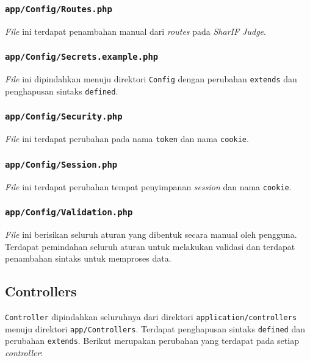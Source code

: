 \subsubsection{\texttt{app/Config/Routes.php}}
\textit{File} ini terdapat penambahan manual dari \textit{routes} pada \textit{SharIF Judge}.
\subsubsection{\texttt{app/Config/Secrets.example.php}}
\textit{File} ini dipindahkan menuju direktori \texttt{Config} dengan perubahan \texttt{extends} dan penghapusan sintaks \texttt{defined}.
\subsubsection{\texttt{app/Config/Security.php}}
\textit{File} ini terdapat perubahan pada nama \texttt{token} dan nama \texttt{cookie}.
\subsubsection{\texttt{app/Config/Session.php}}
\textit{File} ini terdapat perubahan tempat penyimpanan \textit{session} dan nama \texttt{cookie}.
\subsubsection{\texttt{app/Config/Validation.php}}
\textit{File} ini berisikan seluruh aturan yang dibentuk secara manual oleh pengguna. Terdapat pemindahan seluruh aturan untuk melakukan validasi dan terdapat penambahan sintaks untuk memproses data.

\subsection{Controllers}
\texttt{Controller} dipindahkan seluruhnya dari direktori \texttt{application/controllers} menuju direktori \texttt{app/Controllers}. Terdapat penghapusan sintaks \texttt{defined} dan perubahan \texttt{extends}. Berikut merupakan perubahan yang terdapat pada setiap \textit{controller}:
